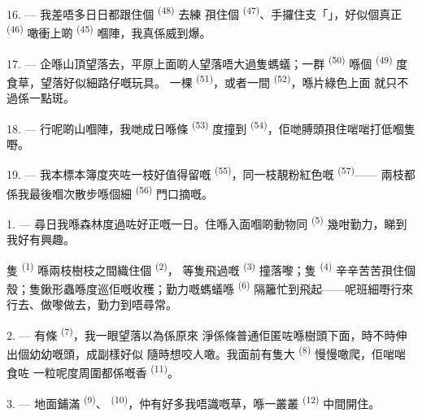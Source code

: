 \VUsaut{3.0mm}

16. --- 我差唔多日日都跟住個 \textsuperscript{(48)} 去練
孭住個 \textsuperscript{(47)}、手攞住支「」，好似個真正
 \textsuperscript{(46)} 噉衝上啲 \textsuperscript{(45)} 嗰陣，我真係威到爆。

17. --- 企喺山頂望落去，平原上面啲人望落唔大過隻螞蟻；一群
\textsuperscript{(50)} 喺個 \textsuperscript{(49)} 度食草，望落好似細路仔嘅玩具。
一棵 \textsuperscript{(51)}，或者一間 \textsuperscript{(52)}，喺片綠色上面
就只不過係一點斑。

18. --- 行呢啲山嗰陣，我哋成日喺條 \textsuperscript{(53)} 度撞到
 \textsuperscript{(54)}，佢哋膊頭孭住啱啱打低嗰隻嘢。

19. --- 我本標本簿度夾咗一枝好值得留嘅
\textsuperscript{(55)}，同一枝靚粉紅色嘅 \textsuperscript{(57)}——
兩枝都係我最後嗰次散步喺個細 \textsuperscript{(56)} 門口摘嘅。

\VUsaut{3.0mm}
\VUsaut{3.0mm}

\VUsaut{3.0mm}

1. --- 尋日我喺森林度過咗好正嘅一日。住喺入面嗰啲動物同
\textsuperscript{(5)} 幾咁勤力，睇到我好有興趣。

隻 \textsuperscript{(1)} 喺兩枝樹枝之間織住個 \textsuperscript{(2)}，
等隻飛過嘅 \textsuperscript{(3)} 撞落嚟；隻 \textsuperscript{(4)}
辛辛苦苦孭住個殼；隻鍬形蟲喺度巡佢嘅收穫；勤力嘅螞蟻喺
\textsuperscript{(6)} 隔籬忙到飛起——呢班細嘢行來行去、做嚟做去，勤力到唔尋常。

2. --- 有條 \textsuperscript{(7)}，我一眼望落以為係原來
淨係條普通佢匿咗喺樹頭下面，時不時伸出個幼幼嘅頭，成副樣好似
隨時想咬人噉。我面前有隻大 \textsuperscript{(8)} 慢慢噉爬，佢啱啱食咗
一粒呢度周圍都係嘅香 \textsuperscript{(11)}。

3. --- 地面鋪滿 \textsuperscript{(9)}、
 \textsuperscript{(10)}，仲有好多我唔識嘅草，喺一叢叢
\textsuperscript{(12)} 中間開住。

